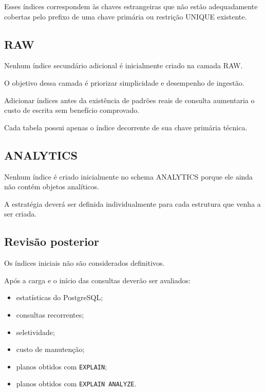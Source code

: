 \documentclass[12pt,a4paper]{article}
\begin{document}
{	Esses índices correspondem às chaves estrangeiras que não estão
	adequadamente cobertas pelo prefixo de uma chave primária ou
	restrição UNIQUE existente.
	
	\subsection{RAW}
	
	Nenhum índice secundário adicional é inicialmente criado na camada RAW.
	
	O objetivo dessa camada é priorizar simplicidade e desempenho de
	ingestão.
	
	Adicionar índices antes da existência de padrões reais de consulta
	aumentaria o custo de escrita sem benefício comprovado.
	
	Cada tabela possui apenas o índice decorrente de sua chave primária
	técnica.
	
	\subsection{ANALYTICS}
	
	Nenhum índice é criado inicialmente no schema ANALYTICS porque ele
	ainda não contém objetos analíticos.
	
	A estratégia deverá ser definida individualmente para cada estrutura
	que venha a ser criada.
	
	\subsection{Revisão posterior}
	
	Os índices iniciais não são considerados definitivos.
	
	Após a carga e o início das consultas deverão ser avaliados:
	
	\begin{itemize}[leftmargin=1.2cm]
		\item estatísticas do PostgreSQL;
		\item consultas recorrentes;
		\item seletividade;
		\item custo de manutenção;
		\item planos obtidos com \texttt{EXPLAIN};
		\item planos obtidos com \texttt{EXPLAIN ANALYZE}.
	\end{itemize}
	
}
\end{document}
